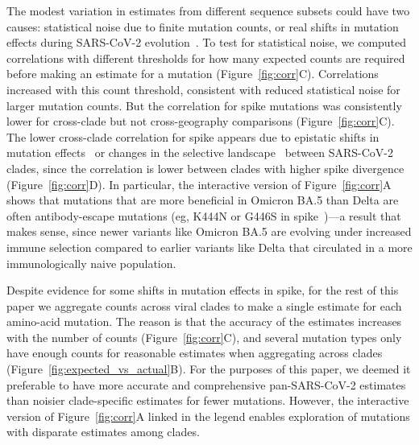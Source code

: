 \documentclass[9pt,twocolumn,twoside]{gsajnl_modified}
\begin{document}
The modest variation in estimates from different sequence subsets could have two causes: statistical noise due to finite mutation counts, or real shifts in mutation effects during SARS-CoV-2 evolution~\citep{starr2022shifting,moulana2022compensatory}.
To test for statistical noise, we computed correlations with different thresholds for how many expected counts are required before making an estimate for a mutation (Figure~\ref{fig:corr}C).
Correlations increased with this count threshold, consistent with reduced statistical noise for larger mutation counts.
But the correlation for spike mutations was consistently lower for cross-clade but not cross-geography comparisons (Figure~\ref{fig:corr}C).
The lower cross-clade correlation for spike appears due to epistatic shifts in mutation effects~\citep{starr2022shifting, moulana2022compensatory, pollock2012amino, shah2015contingency, lee2018deep} or changes in the selective landscape~\citep{sun2023rapidly} between SARS-CoV-2 clades, since the correlation is lower between clades with higher spike divergence (Figure~\ref{fig:corr}D).
In particular, the interactive version of Figure~\ref{fig:corr}A shows that mutations that are more beneficial in Omicron BA.5 than Delta are often antibody-escape mutations (eg, K444N or G446S in spike~\citep{greaney2022antibody})---a result that makes sense, since newer variants like Omicron BA.5 are evolving under increased immune selection compared to earlier variants like Delta that circulated in a more immunologically naive population.

Despite evidence for some shifts in mutation effects in spike, for the rest of this paper we aggregate counts across viral clades to make a single estimate for each amino-acid mutation.
The reason is that the accuracy of the estimates increases with the number of counts (Figure~\ref{fig:corr}C), and several mutation types only have enough counts for reasonable estimates when aggregating across clades (Figure~\ref{fig:expected_vs_actual}B).
For the purposes of this paper, we deemed it preferable to have more accurate and comprehensive pan-SARS-CoV-2 estimates than noisier clade-specific estimates for fewer mutations.
However, the interactive version of Figure~\ref{fig:corr}A linked in the legend enables exploration of mutations with disparate estimates among clades.
\end{document}
